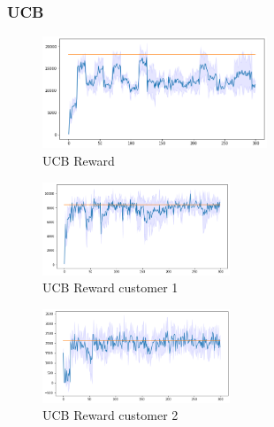 \subsubsection{UCB}
\begin{figure}[ht]
    \begin{center}
    \includegraphics[width=0.6\textwidth]{img/ucb7.png}
    \caption{UCB Reward}
    \label{fig:reward7}
    \end{center}
\end{figure}
\begin{multicols}{2}
    \begin{figure}[H]
        \begin{center}
        \includegraphics[width=0.5\textwidth]{img/ucb7_1.png}
        \caption{UCB Reward customer 1}
        \label{fig:reward71}
        \end{center}
    \end{figure}
    \columnbreak
    \begin{figure}[H]
        \begin{center}
        \includegraphics[width=0.5\textwidth]{img/ucb7_2.png}
        \caption{UCB Reward customer 2}
        \label{fig:reward72}
        \end{center}
    \end{figure}
\end{multicols}
